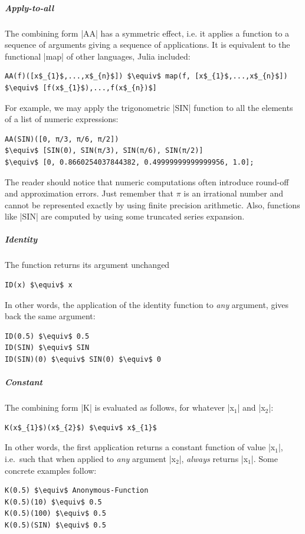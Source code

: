 \subparagraph{Apply-to-all}
The combining form |AA| has a symmetric effect, i.e. it
applies a function to a sequence of arguments giving a sequence of applications. It is equivalent to the functional |map|  of other languages, Julia included:
\begin{lstlisting}[language=JuliaLocal, style=julia, mathescape = true] 
AA(f)([x$_{1}$,...,x$_{n}$]) $\equiv$ map(f, [x$_{1}$,...,x$_{n}$]) $\equiv$ [f(x$_{1}$),...,f(x$_{n})$]
\end{lstlisting}
For example, we may apply the trigonometric |SIN| function to all the elements of a 
list of numeric expressions:
\begin{lstlisting}[language=JuliaLocal, style=julia, mathescape = true] 
AA(SIN)([0, π/3, π/6, π/2]) 
$\equiv$ [SIN(0), SIN(π/3), SIN(π/6), SIN(π/2)]
$\equiv$ [0, 0.8660254037844382, 0.49999999999999956, 1.0];
\end{lstlisting}
The reader should notice that numeric computations often introduce
round-off and approximation errors.  Just remember that $\pi$ is an
irrational number and cannot be represented exactly by using finite
precision arithmetic.  Also, functions like |SIN| are computed
by using some truncated series expansion.

\subparagraph{Identity}
The function  returns its argument unchanged
\begin{lstlisting}[language=JuliaLocal, style=julia, mathescape = true] 
ID(x) $\equiv$ x
\end{lstlisting}
In other words, the application of the identity function to \emph{any} argument, 
gives back the same argument:
\begin{lstlisting}[language=JuliaLocal, style=julia, mathescape = true] 
ID(0.5) $\equiv$ 0.5
ID(SIN) $\equiv$ SIN  
ID(SIN)(0) $\equiv$ SIN(0) $\equiv$ 0 
\end{lstlisting}


\subparagraph{Constant}

The combining form |K| is evaluated as follows, for
whatever |x$_{1}$| and |x$_{2}$|: 
\begin{lstlisting}[language=JuliaLocal, style=julia, mathescape = true]
K(x$_{1}$)(x$_{2}$) $\equiv$ x$_{1}$
\end{lstlisting}
In other words, the first application returns a constant function of
value |x$_{1}$|, i.e.~such that when applied to \emph{any}
argument |x$_{2}$|, \emph{always} returns |x$_{1}$|. 
Some concrete examples follow:
\begin{lstlisting}[language=JuliaLocal, style=julia, mathescape = true] 
K(0.5) $\equiv$ Anonymous-Function 
K(0.5)(10) $\equiv$ 0.5 
K(0.5)(100) $\equiv$ 0.5 
K(0.5)(SIN) $\equiv$ 0.5 
\end{lstlisting}



